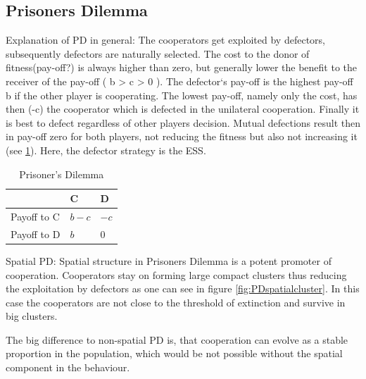 \documentclass[DIV=calc, paper=a4, fontsize=11pt, twocolumn]{scrartcl}	 %
\begin{document}
\subsection*{Prisoners Dilemma}

Explanation of PD in general:
The cooperators get exploited by defectors, subsequently defectors are naturally selected. The cost to the donor of fitness(pay-off?) is always higher than zero, but generally lower the benefit to the receiver of the pay-off ( b > c > 0 ). The defector‘s pay-off is the highest pay-off b if the other player is cooperating. The lowest pay-off, namely only the cost, has then (-c) the cooperator which is defected in the unilateral cooperation. Finally it is best to defect regardless of other players decision. Mutual defections result then in pay-off zero for both players, not reducing the fitness but also not increasing it (see \ref{table1}). Here, the defector strategy is the ESS. 

\begin{table}[h]
\caption{Prisoner's Dilemma}
\label{table1}
\centering
\begin{tabular}{lll}
 & C & D \\
\midrule
Payoff to C & $b-c$ & $-c$ \\
Payoff to D & $b$ & $0$ \\
\bottomrule
\end{tabular}
\end{table}

Spatial PD: 
Spatial structure in Prisoners Dilemma is a potent promoter of cooperation. Cooperators stay on forming large compact clusters thus reducing the exploitation by defectors as one can see in figure \ref{fig:PDspatialcluster}. In this case the cooperators are not close to the threshold of extinction and survive in big clusters. 

The big difference to non-spatial PD is, that cooperation can evolve as a stable proportion in the population, which would be not possible without the spatial component in the behaviour. 
\end{document}
